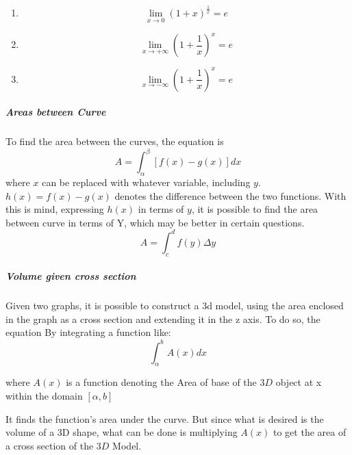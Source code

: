 \documentclass{article} %
\theoremstyle{theorem}
\theoremstyle{definition}
\begin{document}
                    \begin{enumerate}[label=(\alph*)]
                        \item \begin{equation} \lim_{x\rightarrow0}(1+x)^{\frac{1}{x}}=e \end{equation}
                        \item \begin{equation} \lim_{x\rightarrow +\infty}(1+\frac{1}{x})^x=e \end{equation}
                        \item \begin{equation} \lim_{x\rightarrow -\infty}(1+\frac{1}{x})^x=e \end{equation}
                    \end{enumerate}
                \subparagraph{Areas between Curve}
                    To find the area between the curves, the equation is \begin{equation}
                        A=\int_{\alpha}^{\beta}[f(x)-g(x)]dx
                        \label{eq:AreaBtCurve}
                    \end{equation}
                    where $x$ can be replaced with whatever variable, including $y$. $h(x) = f(x) - g(x)$ denotes the difference between the two functions. With this is mind, expressing $h(x)$ in terms of $y$, it is possible to find the area between curve in terms of Y, which may be better in certain questions. 
                    \begin{equation}
                        A = \int_{c}^{d}f(y)\Delta y
                        \label{eq:ABtwnCurvdy}
                    \end{equation}
                \subparagraph{Volume given cross section}
                    Given two graphs, it is possible to construct a 3d model, using the area enclosed in the graph as a cross section and extending it in the z axis. To do so, the equation %
                    By integrating a function like: $$\int^b_\alpha A(x)dx$$
                    \begin{center} where $A(x)$ is a function denoting the Area of base of the $3D$ object at x within the domain $[\alpha,b]$ \end{center}
                    It finds the function's area under the curve. But since what is desired is the volume of a 3D shape, what can be done
                    is multiplying $A(x)$ to get the area of a cross section of the $3D$ Model. 
\end{document}
